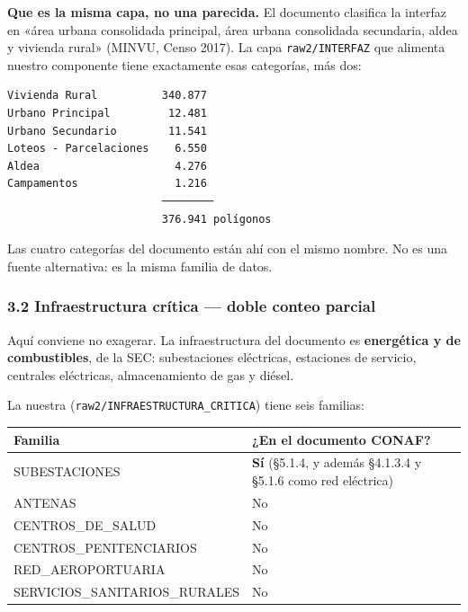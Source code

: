 \documentclass[
  spanish,
  10pt,
]{article}
\begin{document}
\textbf{Que es la misma capa, no una parecida.} El documento clasifica
la interfaz en «área urbana consolidada principal, área urbana
consolidada secundaria, aldea y vivienda rural» (MINVU, Censo 2017). La
capa \texttt{raw2/INTERFAZ} que alimenta nuestro componente tiene
exactamente esas categorías, más dos:

\begin{verbatim}
Vivienda Rural          340.877
Urbano Principal         12.481
Urbano Secundario        11.541
Loteos - Parcelaciones    6.550
Aldea                     4.276
Campamentos               1.216
                        ────────
                        376.941 polígonos
\end{verbatim}

Las cuatro categorías del documento están ahí con el mismo nombre. No es
una fuente alternativa: es la misma familia de datos.

\subsubsection{\texorpdfstring{3.2 Infraestructura crítica --- doble
conteo
\textbf{parcial}}{3.2 Infraestructura crítica --- doble conteo parcial}}\label{infraestructura-cruxedtica-doble-conteo-parcial}

Aquí conviene no exagerar. La infraestructura del documento es
\textbf{energética y de combustibles}, de la SEC: subestaciones
eléctricas, estaciones de servicio, centrales eléctricas, almacenamiento
de gas y diésel.

La nuestra (\texttt{raw2/INFRAESTRUCTURA\_CRITICA}) tiene seis familias:

\begin{longtable}[]{@{}
  >{\raggedright\arraybackslash}p{}
  >{\raggedright\arraybackslash}p{}@{}}
\toprule\noalign{}
\begin{minipage}[b]{\linewidth}\raggedright
Familia
\end{minipage} & \begin{minipage}[b]{\linewidth}\raggedright
¿En el documento CONAF?
\end{minipage} \\
\midrule\noalign{}
\endhead
\bottomrule\noalign{}
\endlastfoot
SUBESTACIONES & \textbf{Sí} (§5.1.4, y además §4.1.3.4 y §5.1.6 como red
eléctrica) \\
ANTENAS & No \\
CENTROS\_DE\_SALUD & No \\
CENTROS\_PENITENCIARIOS & No \\
RED\_AEROPORTUARIA & No \\
SERVICIOS\_SANITARIOS\_RURALES & No \\
\end{longtable}
\end{document}

